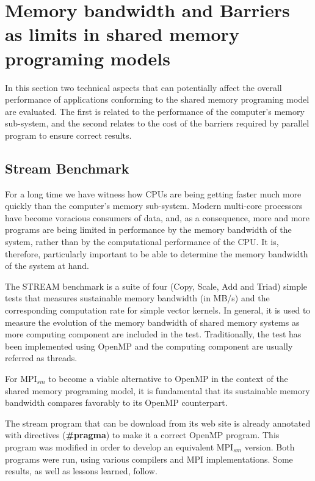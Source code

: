 \section{Memory bandwidth and Barriers as limits in shared memory programing models}

In this section two technical aspects that can potentially affect the overall performance of applications conforming to the shared memory programing model are evaluated. The first is related to the performance of the computer's memory sub-system, and the second relates to the cost of the barriers required by parallel program to ensure correct results.


\subsection*{Stream Benchmark}

For a long time we have witness how CPUs are being getting faster much more quickly than the computer's memory sub-system. Modern multi-core processors have become voracious consumers of data, and, as a consequence, more and more programs are being limited in performance by the memory bandwidth of the system, rather than by the computational performance of the CPU\cite{McCalpin2007}. It is, therefore, particularly important to be able to determine the memory bandwidth of the system at hand. 

\medskip


The STREAM benchmark\cite{McCalpin2007} is a suite of four (Copy, Scale, Add and Triad) simple tests that measures sustainable memory bandwidth (in MB/s) and the corresponding computation rate for simple vector kernels. In general, it is used to measure the evolution of the memory bandwidth of shared memory systems as more computing component are included in the test. Traditionally, the test has been implemented using OpenMP and the computing component are usually referred as threads.

\medskip

For MPI$_{sm}$ to become a viable alternative to OpenMP in the context of the shared memory programing model, it is fundamental that its sustainable memory bandwidth compares favorably to its OpenMP counterpart.

\medskip

The stream program that can be download from its web site \cite{McCalpin2007} is already annotated with directives (\textbf{\#pragma}) to make it a correct OpenMP program. This program was modified in order to develop an equivalent  MPI$_{sm}$ version. Both programs were run, using various compilers and MPI implementations. Some results, as well as lessons learned, follow.

